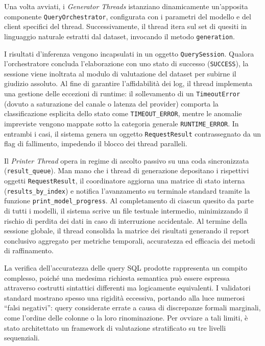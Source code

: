 Una volta avviati, i \emph{Generator Threads} istanziano dinamicamente
un'apposita componente \texttt{QueryOrchestrator}, configurata con i
parametri del modello e del client specifici del thread.
Successivamente, il thread itera sul set di quesiti in linguaggio
naturale estratti dal dataset, invocando il metodo \texttt{generation}.

I risultati d'inferenza vengono incapsulati in un oggetto
\texttt{QuerySession}. Qualora l'orchestratore concluda l'elaborazione
con uno stato di successo (\texttt{SUCCESS}), la sessione viene
inoltrata al modulo di valutazione del dataset per subirne il giudizio
assoluto. Al fine di garantire l'affidabilità dei log, il thread
implementa una gestione delle eccezioni di runtime: il
sollevamento di un \texttt{TimeoutError} (dovuto a saturazione del
canale o latenza del provider) comporta la classificazione esplicita
dello stato come \texttt{TIMEOUT\_ERROR}, mentre le anomalie impreviste
vengono mappate sotto la categoria generale \texttt{RUNTIME\_ERROR}. In
entrambi i casi, il sistema genera un oggetto \texttt{RequestResult}
contrassegnato da un flag di fallimento, impedendo il blocco dei thread
paralleli.

Il \emph{Printer Thread} opera in regime di ascolto passivo su una coda
sincronizzata (\texttt{result\_queue}). Man mano che i thread di
generazione depositano i rispettivi oggetti \texttt{RequestResult}, il
coordinatore aggiorna una matrice di stato interna
(\texttt{results\_by\_index}) e notifica l'avanzamento su terminale
standard tramite la funzione \texttt{print\_model\_progress}. Al
completamento di ciascun quesito da parte di tutti i modelli, il sistema
scrive un file testuale intermedio, minimizzando il rischio di perdita
dei dati in caso di interruzione accidentale. Al termine della sessione
globale, il thread consolida la matrice dei risultati generando il
report conclusivo aggregato per metriche temporali, accuratezza ed
efficacia dei metodi di raffinamento.

La verifica dell'accuratezza delle query SQL prodotte rappresenta un
compito complesso, poiché una medesima richiesta semantica può essere
espressa attraverso costrutti sintattici differenti ma logicamente
equivalenti. I validatori standard mostrano spesso una rigidità
eccessiva, portando alla luce numerosi ``falsi negativi'': query
considerate errate a causa di discrepanze formali marginali, come
l'ordine delle colonne o la loro rinominazione. Per ovviare a tali
limiti, è stato architettato un framework di valutazione stratificato su
tre livelli sequenziali.

